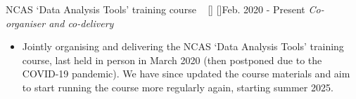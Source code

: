 \begin{projects}
\projecta
	{NCAS `Data Analysis Tools' training course ~ [\href{https://ncas.ac.uk/study-with-us/data-analysis-tools/}{\small{\websiteSymbol}}] [\href{https://github.com/NCAS-CMS/cf-tools-training}{\small{\githubSymbol}}]}{Feb. 2020 - Present}
	{
	    \textit{Co-organiser and co-delivery}
	}
	{\begin{itemize}
     \item Jointly organising and delivering the NCAS `Data Analysis Tools' training course, last held in person in March 2020 (then postponed due to the COVID-19 pandemic). We have since updated the course materials and aim to start running the course more regularly again, starting summer 2025.
     \end{itemize}}



\end{projects}
\vspace{-3mm}
